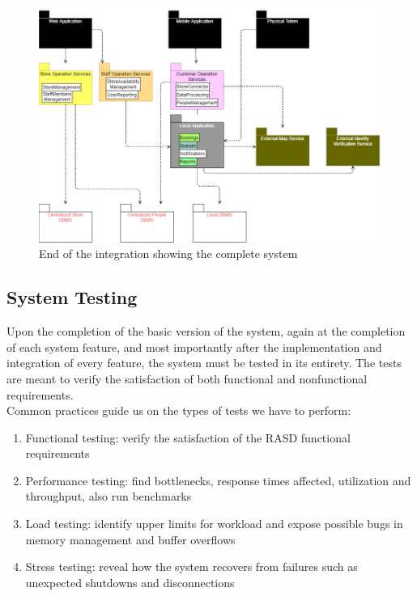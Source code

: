 \begin{enumerate}
	\begin{figure}[H]
		\includegraphics[width=\linewidth]{../Diagrams/IntegrationImplementation/IntegrationFull.png}
		\caption{End of the integration showing the complete system}
		\label{fig:Implementation5}
	\end{figure}
\end{enumerate}

\subsection{System Testing}
Upon the completion of the basic version of the system, again at the completion of each system feature, and most importantly after the implementation and integration of every feature, the system must be tested in its entirety. The tests are meant to verify the satisfaction of both functional and nonfunctional requirements.\\

Common practices guide us on the types of tests we have to perform:
\begin{enumerate}
	\item Functional testing: verify the satisfaction of the RASD functional requirements
	\item Performance testing: find bottlenecks, response times affected, utilization and throughput, also run benchmarks
	\item Load testing: identify upper limits for workload and expose possible bugs in memory management and buffer overflows
	\item Stress testing: reveal how the system recovers from failures such as unexpected shutdowns and disconnections
\end{enumerate}

